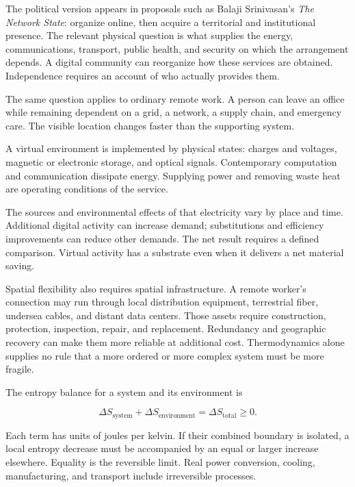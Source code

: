 The political version appears in proposals such as Balaji Srinivasan's \emph{The Network State}: organize online, then acquire a territorial and institutional presence. The relevant physical question is what supplies the energy, communications, transport, public health, and security on which the arrangement depends. A digital community can reorganize how these services are obtained. Independence requires an account of who actually provides them.

The same question applies to ordinary remote work. A person can leave an office while remaining dependent on a grid, a network, a supply chain, and emergency care. The visible location changes faster than the supporting system.


A virtual environment is implemented by physical states: charges and voltages, magnetic or electronic storage, and optical signals. Contemporary computation and communication dissipate energy. Supplying power and removing waste heat are operating conditions of the service.

The sources and environmental effects of that electricity vary by place and time. Additional digital activity can increase demand; substitutions and efficiency improvements can reduce other demands. The net result requires a defined comparison. Virtual activity has a substrate even when it delivers a net material saving.

Spatial flexibility also requires spatial infrastructure. A remote worker's connection may run through local distribution equipment, terrestrial fiber, undersea cables, and distant data centers. Those assets require construction, protection, inspection, repair, and replacement. Redundancy and geographic recovery can make them more reliable at additional cost. Thermodynamics alone supplies no rule that a more ordered or more complex system must be more fragile.

The entropy balance for a system and its environment is

\begin{equation}
\Delta S_{\mathrm{system}}+\Delta S_{\mathrm{environment}}
=\Delta S_{\mathrm{total}}\geq 0.
\end{equation}

Each term has units of joules per kelvin. If their combined boundary is isolated, a local entropy decrease must be accompanied by an equal or larger increase elsewhere. Equality is the reversible limit. Real power conversion, cooling, manufacturing, and transport include irreversible processes.

